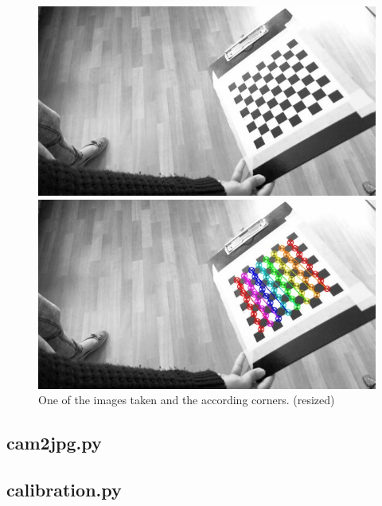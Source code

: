 \documentclass{scrartcl}
\begin{document}
\begin{figure}[H]
\centering
\begin{minipage}{.5\textwidth}
  \centering
  \includegraphics[width=.8\linewidth]{img/cap_18.jpg}
\end{minipage}%
\begin{minipage}{.5\textwidth}
  \centering
  \includegraphics[width=.8\linewidth]{img/cap_18_corners.jpg}
\end{minipage}
\caption{One of the images taken and the according corners. (resized)}
\label{fig:output}
\end{figure}



\subsection{cam2jpg.py}



\subsection{calibration.py}






\end{document}
